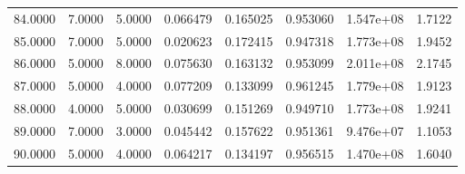 \documentclass[11pt]{report}
\begin{document}
\begin{longtable}{llllllll}
84.0000 & 7.0000 & 5.0000 & 0.066479 & 0.165025 & 0.953060 & 1.547e+08 & 1.7122 \\
85.0000 & 7.0000 & 5.0000 & 0.020623 & 0.172415 & 0.947318 & 1.773e+08 & 1.9452 \\
86.0000 & 5.0000 & 8.0000 & 0.075630 & 0.163132 & 0.953099 & 2.011e+08 & 2.1745 \\
87.0000 & 5.0000 & 4.0000 & 0.077209 & 0.133099 & 0.961245 & 1.779e+08 & 1.9123 \\
88.0000 & 4.0000 & 5.0000 & 0.030699 & 0.151269 & 0.949710 & 1.773e+08 & 1.9241 \\
89.0000 & 7.0000 & 3.0000 & 0.045442 & 0.157622 & 0.951361 & 9.476e+07 & 1.1053 \\
90.0000 & 5.0000 & 4.0000 & 0.064217 & 0.134197 & 0.956515 & 1.470e+08 & 1.6040 \\
\bottomrule
\end{longtable}
\end{document}
